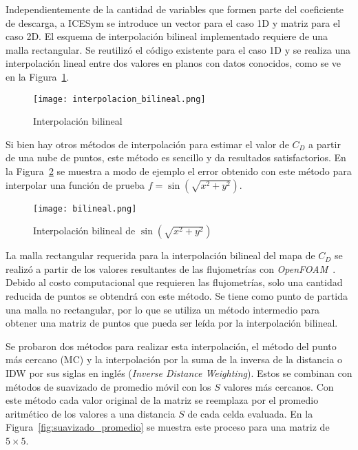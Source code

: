 
Independientemente de la cantidad de variables que formen parte del coeficiente
de descarga, a ICESym se introduce un vector para el caso 1D y matriz para el
caso 2D.
%
El esquema de interpolación bilineal implementado requiere de una malla
rectangular.
%
Se reutilizó el código existente para el caso 1D y se realiza una interpolación
lineal entre dos valores en planos con datos conocidos, como se ve en la
Figura~\ref{fig:interp_bilineal}.

\begin{figure}
    \centering
    \texttt{[image: interpolacion\_bilineal.png]}
    \caption{Interpolación bilineal\protect\footnotemark}\label{fig:interp_bilineal}
\end{figure}


Si bien hay otros métodos de interpolación para estimar el valor de $C_D$ a
partir de una nube de puntos, este método es sencillo y da resultados
satisfactorios.
%
En la Figura~\ref{fig:bilineal} se muestra a modo de ejemplo el error obtenido
con este método para interpolar una función de prueba
$f=\sin\left(\sqrt{x^2 + y^2}\right)$.

\begin{figure}
    \centering
    \texttt{[image: bilineal.png]}
    \caption{Interpolación bilineal de $\sin(\sqrt{x^2 + y^2})$}\label{fig:bilineal}
\end{figure}

La malla rectangular requerida para la interpolación bilineal del mapa de
$C_{D}$ se realizó a partir de los valores resultantes de las flujometrías con
\emph{OpenFOAM}~\parencite{openfoam}.
%
Debido al costo computacional que requieren las flujometrías, solo una cantidad
reducida de puntos se obtendrá con este método.
%
Se tiene como punto de partida una malla no rectangular, por lo que se utiliza
un método intermedio para obtener una matriz de puntos que pueda ser leída por
la interpolación bilineal.

Se probaron dos métodos para realizar esta interpolación, el método del punto más
cercano (MC) y la interpolación por la suma de la inversa de la distancia o IDW por
sus siglas en inglés (\emph{Inverse Distance Weighting}).
%
Estos se combinan con métodos de suavizado de promedio móvil con los $S$ valores
más cercanos.
%
Con este método cada valor original de la matriz se reemplaza por el promedio
aritmético de los valores a una distancia $S$ de cada celda evaluada.
%
En la Figura~\ref{fig:suavizado_promedio} se muestra este proceso para una
matriz de $5\times5$.

